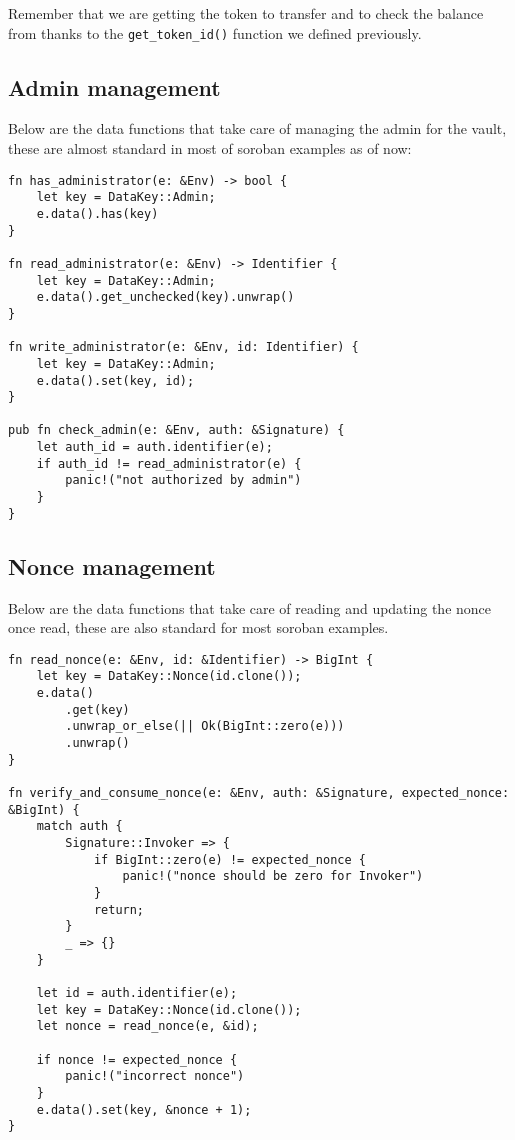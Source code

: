 \documentclass{article}
\newcommand{\inl}[1]{\lstinline{#1}}
\begin{document}
Remember that we are getting the token to transfer and to check the balance from thanks to the \inl{get_token_id()} function we defined previously.


\subsection{Admin management}
Below are the data functions that take care of managing the admin for the vault, these are almost standard in most of soroban examples as of now:

\begin{lstlisting}
fn has_administrator(e: &Env) -> bool {
    let key = DataKey::Admin;
    e.data().has(key)
}

fn read_administrator(e: &Env) -> Identifier {
    let key = DataKey::Admin;
    e.data().get_unchecked(key).unwrap()
}

fn write_administrator(e: &Env, id: Identifier) {
    let key = DataKey::Admin;
    e.data().set(key, id);
}

pub fn check_admin(e: &Env, auth: &Signature) {
    let auth_id = auth.identifier(e);
    if auth_id != read_administrator(e) {
        panic!("not authorized by admin")
    }
}
\end{lstlisting}

\subsection{Nonce management}
Below are the data functions that take care of reading and updating the nonce once read, these are also standard for most soroban examples.

\begin{lstlisting}
fn read_nonce(e: &Env, id: &Identifier) -> BigInt {
    let key = DataKey::Nonce(id.clone());
    e.data()
        .get(key)
        .unwrap_or_else(|| Ok(BigInt::zero(e)))
        .unwrap()
}

fn verify_and_consume_nonce(e: &Env, auth: &Signature, expected_nonce: &BigInt) {
    match auth {
        Signature::Invoker => {
            if BigInt::zero(e) != expected_nonce {
                panic!("nonce should be zero for Invoker")
            }
            return;
        }
        _ => {}
    }

    let id = auth.identifier(e);
    let key = DataKey::Nonce(id.clone());
    let nonce = read_nonce(e, &id);

    if nonce != expected_nonce {
        panic!("incorrect nonce")
    }
    e.data().set(key, &nonce + 1);
}
\end{lstlisting}
\end{document}
